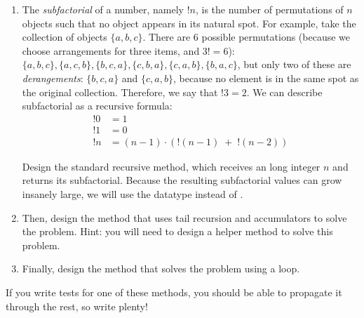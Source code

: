 \begin{enumerate}[label=(\alph*)]
    \item The \emph{subfactorial} of a number, namely $!n$, is the number of permutations of $n$ objects such that no object appears in its natural spot. For example, take the collection of objects $\{a, b, c\}$. There are $6$ possible permutations (because we choose arrangements for three items, and $3!=6$): $\{a, b, c\}, \{a, c, b\}, \{b, c, a\}, \{c, b, a\}, \{c, a, b\}, \{b, a, c\}$, but only two of these are \emph{derangements}: $\{b, c, a\}$ and $\{c, a, b\}$, because no element is in the same spot as the original collection. Therefore, we say that $!3=2$. We can describe subfactorial as a recursive formula:
\begin{align*}
    !0 &= 1\\
    !1 &= 0\\
    !n &= (n-1) \cdot (!(n - 1)\;+\;!(n - 2))
\end{align*}

    Design the standard recursive  method, which receives an long integer $n$ and returns its subfactorial. Because the resulting subfactorial values can grow insanely large, we will use the  datatype instead of .

    \item Then, design the  method that uses tail recursion and accumulators to solve the problem. Hint: you will need to design a  helper method to solve this problem.

    \item Finally, design the  method that solves the problem using a loop.
\end{enumerate}

If you write tests for one of these methods, you should be able to propagate it through the rest, so write plenty!

